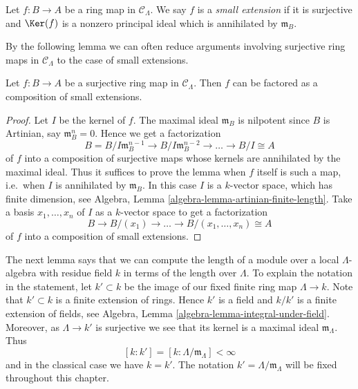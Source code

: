 \begin{definition}
\label{definition-small-extension}
Let $f: B \to A$ be a ring map in $\mathcal{C}_\Lambda$.  We say $f$
is a {\it small extension} if it is surjective and $\Ker(f)$ is a nonzero
principal ideal which is annihilated by $\mathfrak{m}_B$.
\end{definition}

\noindent
By the following lemma we can often reduce arguments involving surjective ring
maps in $\mathcal{C}_\Lambda$ to the case of small extensions.

\begin{lemma}
\label{lemma-factor-small-extension}
Let $f: B \to A$ be a surjective ring map in $\mathcal{C}_\Lambda$.
Then $f$ can be factored as a composition of small extensions.
\end{lemma}

\begin{proof}
Let $I$ be the kernel of $f$.  The maximal ideal $\mathfrak{m}_B$ is
nilpotent since $B$ is Artinian, say $\mathfrak{m}_B^n = 0$. Hence we get a
factorization
$$
B = B/I\mathfrak{m}_B^{n-1} \to B/I\mathfrak{m}_B^{n-2} \to
\ldots \to B/I \cong A
$$
of $f$ into a composition of surjective maps whose kernels are annihilated by
the maximal ideal.  Thus it suffices to prove the lemma when $f$ itself is such
a map, i.e.\ when $I$ is annihilated by $\mathfrak{m}_B$. In this case
$I$ is a $k$-vector space, which has finite dimension, see
Algebra, Lemma \ref{algebra-lemma-artinian-finite-length}.
Take a basis $x_1, \ldots, x_n$ of $I$ as a $k$-vector space to get a
factorization
$$
B \to B/(x_1) \to \ldots \to  B/(x_1, \ldots, x_n) \cong  A
$$
of $f$ into a composition of small extensions.
\end{proof}

\noindent
The next lemma says that we can compute the length of a module over a local
$\Lambda$-algebra with residue field $k$ in terms of the length over
$\Lambda$. To explain the notation in the statement, let $k' \subset k$
be the image of our fixed finite ring map $\Lambda \to k$. Note
that $k' \subset k$ is a finite extension of rings. Hence $k'$ is a field
and $k/k'$ is a finite extension of fields, see
Algebra, Lemma \ref{algebra-lemma-integral-under-field}.
Moreover, as $\Lambda \to k'$ is surjective we see that its kernel
is a maximal ideal $\mathfrak m_\Lambda$. Thus
\begin{equation}
\label{equation-k-prime}
[k : k'] = [k : \Lambda/\mathfrak m_\Lambda] < \infty
\end{equation}
and in the classical case we have $k = k'$. The notation
$k' = \Lambda/\mathfrak m_\Lambda$ will be fixed throughout this chapter.

